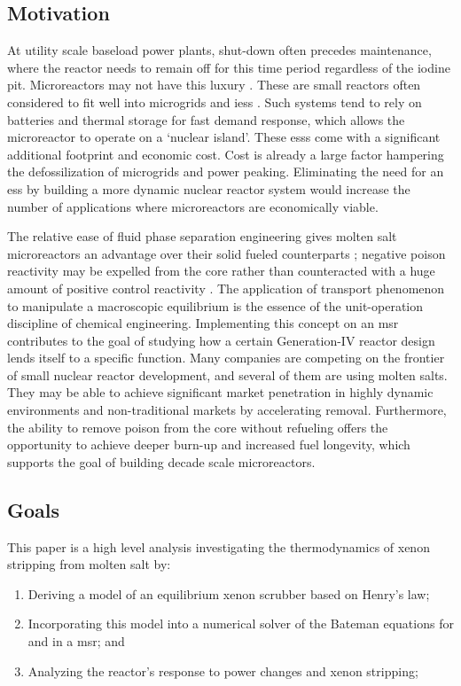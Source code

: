 \subsection{Motivation}
At utility scale baseload power plants, shut-down often precedes maintenance, where the reactor needs to remain off for this time period regardless of the iodine pit. Microreactors may not have this luxury \cite{micro}. These are small reactors often considered to fit well into microgrids \cite{BikashMicro} and \acfp{ies} \cite{AmeyIES}. Such systems tend to rely on batteries and thermal storage for fast demand response, which allows the microreactor to operate on a `nuclear island'. These \acfp{ess} come with a significant additional footprint and economic cost. Cost is already a large factor hampering the defossilization of microgrids and power peaking. Eliminating the need for an \acs{ess} by building a more dynamic nuclear reactor system would increase the number of applications where microreactors are economically viable.
 
The relative ease of fluid phase separation engineering gives molten salt microreactors an advantage over their solid fueled counterparts \cite{CarterPHD,PetersonMS}; negative poison reactivity may be expelled from the core rather than counteracted with a huge amount of positive control reactivity \cite{ORNL-xenonbehavior}. The application of transport phenomenon to manipulate a macroscopic equilibrium is the essence of the unit-operation discipline of chemical engineering. Implementing this concept on an \acs{msr} contributes to the goal of studying how a certain Generation-IV reactor design lends itself to a specific function. Many companies are competing on the frontier of small nuclear reactor development, and several of them are using molten salts. They may be able to achieve significant market penetration in highly dynamic environments and non-traditional markets by accelerating \Xe removal. Furthermore, the ability to remove poison from the core without refueling offers the opportunity to achieve deeper burn-up and increased fuel longevity, which supports the goal of building decade scale microreactors. 

\subsection{Goals}
This paper is a high level analysis investigating the thermodynamics of xenon stripping from molten salt by:
\begin{enumerate}[topsep=3pt,itemsep=-0.75ex,partopsep=1ex,parsep=1ex,label=(\arabic*)]
    \item Deriving a model of an equilibrium xenon scrubber based on Henry's law;
    \item Incorporating this model into a numerical solver of the Bateman equations for \I and \Xe in a \acs{msr}; and 
    \item Analyzing the reactor's response to power changes and xenon stripping; 
\end{enumerate}

